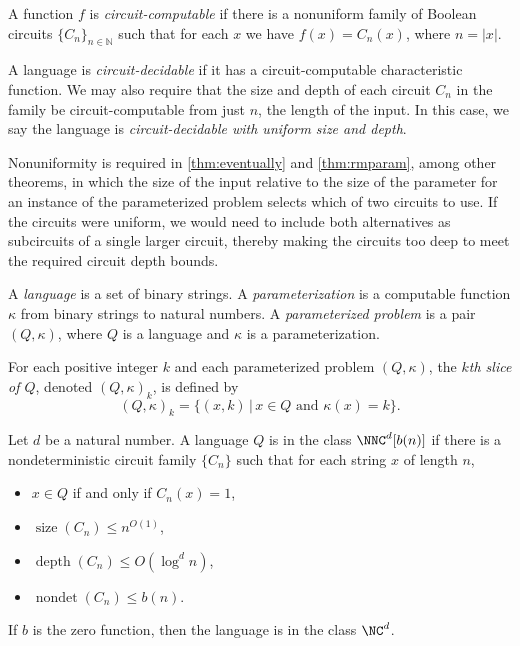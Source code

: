 \documentclass{article}
\DeclareMathOperator{\depth}{depth}
\DeclareMathOperator{\nondet}{nondet}
\DeclareMathOperator{\size}{size}
\begin{document}
\begin{definition}
  A function $f$ is \emph{circuit-computable} if there is a nonuniform family of Boolean circuits $\{C_n\}_{n \in \mathbb{N}}$ such that for each $x$ we have $f(x) = C_n(x)$, where $n = |x|$.

  A language is \emph{circuit-decidable} if it has a circuit-computable characteristic function.
  We may also require that the size and depth of each circuit $C_n$ in the family be circuit-computable from just $n$, the length of the input.
  In this case, we say the language is \emph{circuit-decidable with uniform size and depth}.
\end{definition}

Nonuniformity is required in \autoref{thm:eventually} and \autoref{thm:rmparam}, among other theorems, in which the size of the input relative to the size of the parameter for an instance of the parameterized problem selects which of two circuits to use.
If the circuits were uniform, we would need to include both alternatives as subcircuits of a single larger circuit, thereby making the circuits too deep to meet the required circuit depth bounds.

\begin{definition}
  A \emph{language} is a set of binary strings.
  A \emph{parameterization} is a computable function $\kappa$ from binary strings to natural numbers.
  A \emph{parameterized problem} is a pair $(Q, \kappa)$, where $Q$ is a language and $\kappa$ is a parameterization.
\end{definition}

\begin{definition}
  For each positive integer $k$ and each parameterized problem $(Q, \kappa)$, the \emph{$k$th slice of $Q$}, denoted $(Q, \kappa)_k$, is defined by
  \[
  (Q, \kappa)_k = \{(x, k) \, | \, x \in Q \text{ and } \kappa(x) = k\}.
  \]
\end{definition}

\begin{definition}
  Let $d$ be a natural number.
  A language $Q$ is in the class $\NNC^d[b(n)]$ if there is a nondeterministic circuit family $\{C_n\}$ such that for each string $x$ of length $n$,
  \begin{itemize}
  \item $x \in Q$ if and only if $C_n(x) = 1$,
  \item $\size(C_n) \leq n^{O(1)}$,
  \item $\depth(C_n) \leq O(\log^d n)$,
  \item $\nondet(C_n) \leq b(n)$.
  \end{itemize}
  If $b$ is the zero function, then the language is in the class $\NC^d$.
\end{definition}
\end{document}

